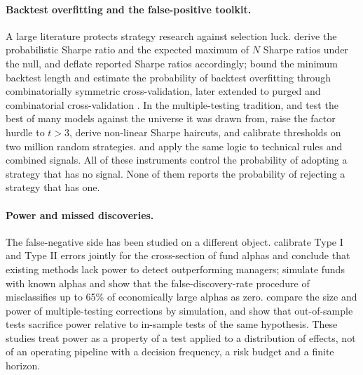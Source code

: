 
\paragraph{Backtest overfitting and the false-positive toolkit.}
A large literature protects strategy research against selection luck. \citet{bailey2012,bailey2014a} derive the probabilistic Sharpe ratio and the expected maximum of $N$ Sharpe ratios under the null, and deflate reported Sharpe ratios accordingly; \citet{bailey2014b,bailey2016} bound the minimum backtest length and estimate the probability of backtest overfitting through combinatorially symmetric cross-validation, later extended to purged and combinatorial cross-validation \citep{lopezdeprado2018}. In the multiple-testing tradition, \citet{white2000} and \citet{hansen2005} test the best of many models against the universe it was drawn from, \citet{harvey2016} raise the factor hurdle to $t > 3$, \citet{harvey2015} derive non-linear Sharpe haircuts, and \citet{chordia2020} calibrate thresholds on two million random strategies. \citet{bajgrowicz2012} and \citet{novymarx2015} apply the same logic to technical rules and combined signals. All of these instruments control the probability of adopting a strategy that has no signal. None of them reports the probability of rejecting a strategy that has one.

\paragraph{Power and missed discoveries.}
The false-negative side has been studied on a different object. \citet{harvey2020a} calibrate Type I and Type II errors jointly for the cross-section of fund alphas and conclude that existing methods lack power to detect outperforming managers; \citet{andrikogiannopoulou2019} simulate funds with known alphas and show that the false-discovery-rate procedure of \citet{barras2010} misclassifies up to 65\% of economically large alphas as zero. \citet{harvey2020b} compare the size and power of multiple-testing corrections by simulation, and \citet{inoue2005} show that out-of-sample tests sacrifice power relative to in-sample tests of the same hypothesis. These studies treat power as a property of a test applied to a distribution of effects, not of an operating pipeline with a decision frequency, a risk budget and a finite horizon.

